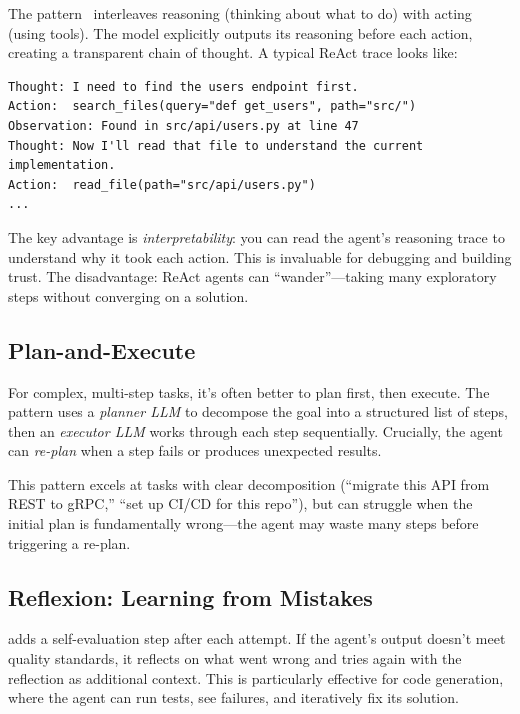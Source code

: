 The  pattern~\cite{yao2023react} interleaves reasoning (thinking about what to do) with acting (using tools). The model explicitly outputs its reasoning before each action, creating a transparent chain of thought. A typical ReAct trace looks like:

\begin{verbatim}
Thought: I need to find the users endpoint first.
Action:  search_files(query="def get_users", path="src/")
Observation: Found in src/api/users.py at line 47
Thought: Now I'll read that file to understand the current implementation.
Action:  read_file(path="src/api/users.py")
...
\end{verbatim}

The key advantage is \emph{interpretability}: you can read the agent's reasoning trace to understand why it took each action. This is invaluable for debugging and building trust. The disadvantage: ReAct agents can ``wander''---taking many exploratory steps without converging on a solution.

\subsection{Plan-and-Execute}

For complex, multi-step tasks, it's often better to plan first, then execute. The  pattern uses a \emph{planner LLM} to decompose the goal into a structured list of steps, then an \emph{executor LLM} works through each step sequentially. Crucially, the agent can \emph{re-plan} when a step fails or produces unexpected results.

This pattern excels at tasks with clear decomposition (``migrate this API from REST to gRPC,'' ``set up CI/CD for this repo''), but can struggle when the initial plan is fundamentally wrong---the agent may waste many steps before triggering a re-plan.

\subsection{Reflexion: Learning from Mistakes}

 adds a self-evaluation step after each attempt. If the agent's output doesn't meet quality standards, it reflects on what went wrong and tries again with the reflection as additional context. This is particularly effective for code generation, where the agent can run tests, see failures, and iteratively fix its solution.

